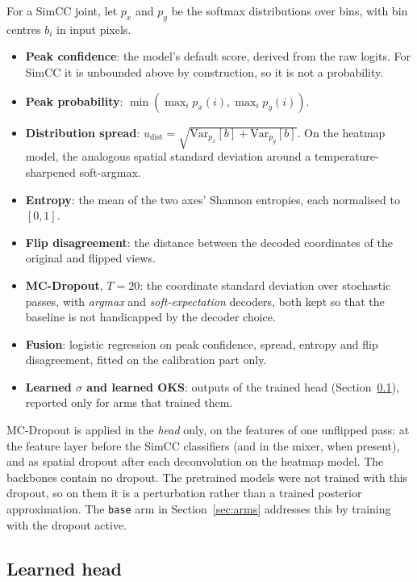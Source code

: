 \documentclass[preprint,11pt]{elsarticle}
\begin{document}
For a SimCC joint, let $p_x$ and $p_y$ be the softmax distributions over bins, with bin centres
$b_i$ in input pixels.
\begin{itemize}
\item \textbf{Peak confidence}: the model's default score, derived from the raw logits. For
SimCC it is unbounded above by construction, so it is not a probability.
\item \textbf{Peak probability}: $\min(\max_i p_x(i), \max_i p_y(i))$.
\item \textbf{Distribution spread}: $u_{\text{dist}} = \sqrt{\mathrm{Var}_{p_x}[b] +
\mathrm{Var}_{p_y}[b]}$. On the heatmap model, the analogous spatial standard deviation around
a temperature-sharpened soft-argmax.
\item \textbf{Entropy}: the mean of the two axes' Shannon entropies, each normalised to $[0,1]$.
\item \textbf{Flip disagreement}: the distance between the decoded coordinates of the original
and flipped views.
\item \textbf{MC-Dropout}, $T{=}20$: the coordinate standard deviation over stochastic passes,
with \emph{argmax} and \emph{soft-expectation} decoders, both kept so that the baseline is not
handicapped by the decoder choice.
\item \textbf{Fusion}: logistic regression on peak confidence, spread, entropy and flip
disagreement, fitted on the calibration part only.
\item \textbf{Learned $\sigma$ and learned OKS}: outputs of the trained head
(Section~\ref{sec:learned}), reported only for arms that trained them.
\end{itemize}

MC-Dropout is applied in the \emph{head} only, on the features of one unflipped pass:
at the feature layer before the SimCC classifiers (and in the mixer, when present), and as
spatial dropout after each deconvolution on the heatmap model. The backbones contain no dropout.
The pretrained models were not trained with this dropout, so on them it is a perturbation rather
than a trained posterior approximation. The \texttt{base} arm in Section~\ref{sec:arms} addresses
this by training with the dropout active.

\subsection{Learned head}\label{sec:learned}
\end{document}
